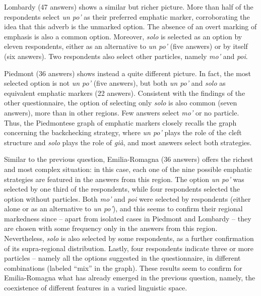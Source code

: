 Lombardy (47 answers) shows a similar but richer picture. More than half of the respondents select \textit{un po’} as their preferred emphatic marker, corroborating the idea that this adverb is the unmarked option. The absence of an overt marking of emphasis is also a common option. Moreover, \textit{solo} is selected as an option by eleven respondents, either as an alternative to \textit{un po’} (five answers) or by itself (six answers). Two respondents also select other particles, namely \textit{mo’} and \textit{poi}.

Piedmont (36 answers) shows instead a quite different picture. In fact, the most selected option is not \textit{un po’} (five answers), but both \textit{un po’} and \textit{solo} as equivalent emphatic markers (22 answers). Consistent with the findings of the other questionnaire, the option of selecting only \textit{solo} is also common (seven answers), more than in other regions. Few answers select \textit{mo’} or no particle. Thus, the Piedmontese graph of emphatic markers closely recalls the graph concerning the backchecking strategy, where \textit{un po’} plays the role of the cleft structure and \textit{solo} plays the role of \textit{già}, and most answers select both strategies.

Similar to the previous question, Emilia-Romagna (36 answers) offers the richest and most complex situation: in this case, each one of the nine possible emphatic strategies are featured in the answers from this region. The option \textit{un po’} was selected by one third of the respondents, while four respondents selected the option without particles. Both \textit{mo’} and \textit{poi} were selected by respondents (either alone or as an alternative to \textit{un po’}), and this seems to confirm their regional markedness since – apart from isolated cases in Piedmont and Lombardy – they are chosen with some frequency only in the answers from this region. Nevertheless, \textit{solo} is also selected by some respondents, as a further confirmation of its supra-regional distribution. Lastly, four respondents indicate three or more particles – namely all the options suggested in the questionnaire, in different combinations (labeled “mix” in the graph). These results seem to confirm for Emilia-Romagna what has already emerged in the previous question, namely, the coexistence of different features in a varied linguistic space.

